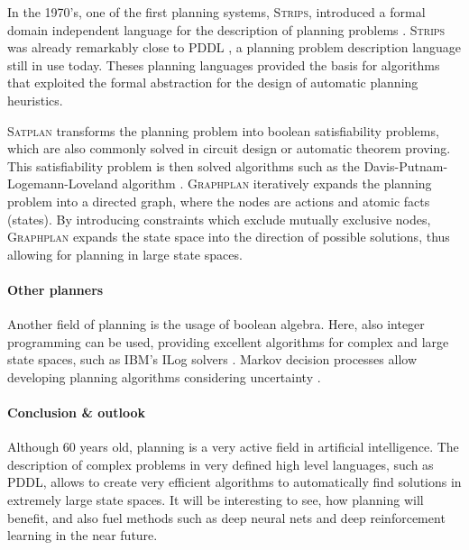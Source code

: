 \documentclass{article}
\begin{document}
In the 1970's, one of the first planning systems, \textsc{Strips}, introduced a
formal domain independent language for the description of planning problems
\cite{strips}. \textsc{Strips} was already remarkably close to \textsc{PDDL} 
\cite{pddl}, a planning problem description language still in use today.
Theses planning languages provided the basis for algorithms that exploited the
formal abstraction for the design of automatic planning heuristics.  

\textsc{Satplan} transforms the planning problem into boolean satisfiability
problems, which are also commonly solved in circuit design or automatic theorem
proving. This satisfiability problem is then solved algorithms such as the
Davis-Putnam-Logemann-Loveland algorithm \cite{dpll}. \textsc{Graphplan}
iteratively expands the planning problem into a directed graph, where the nodes
are actions and atomic facts (states)\cite{graphplan}. By introducing
constraints which exclude mutually exclusive nodes, \textsc{Graphplan} expands
the state space into the direction of possible solutions, thus allowing for
planning in large state spaces.

\paragraph*{Other planners}

Another field of planning is the usage of boolean algebra. Here, also integer
programming can be used, providing excellent algorithms for complex and large
state spaces, such as IBM's ILog solvers \cite{ilog}. Markov decision processes
allow developing planning algorithms considering uncertainty \cite{mdp}. 

\paragraph*{Conclusion \& outlook}

Although 60 years old, planning is a very active field in artificial
intelligence. The description of complex problems in very defined high level
languages, such as \textsc{PDDL}, allows to create very efficient algorithms to
automatically find solutions in extremely large state spaces. It will be
interesting to see, how planning will benefit, and also fuel methods such as
deep neural nets and deep reinforcement learning in the near future.

\printbibliography
\end{document}
